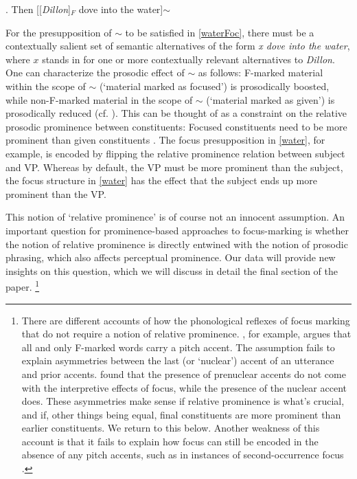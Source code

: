 \documentclass[preprint,review,12pt,authoryear,times]{elsarticle}
\begin{document}
\ex. Then [[{\em Dillon}]$_F$ dove into the water]$\sim$\label{waterFoc}

For the presupposition of $\sim$ to be satisfied in \ref{waterFoc}, there must be  a contextually salient set of semantic alternatives of the form  {\em x dove into the water}, where $x$ stands in for one or more contextually relevant alternatives to {\em Dillon}. One can characterize the prosodic effect of $\sim$ as follows: F-marked material within the scope of $\sim$ (`material marked as focused') is prosodically boosted, while non-F-marked material in the scope of $\sim$ (`material marked as given') is prosodically reduced  (cf. \citealt{rooth92b,truck95}). This can be thought of as a constraint on the relative prosodic prominence between constituents: Focused constituents need to be more prominent than given constituents \citep[cf.][]{willi97,  szend03, wagner05recursion, reinh06, burin16b}. The focus presupposition in \ref{water}, for example, is encoded by flipping the relative prominence relation between subject and VP. Whereas by default, the VP must be more prominent than the subject, the focus structure in \ref{water} has the effect that the subject ends up more prominent than the VP. 

This notion of `relative prominence' is of course not an innocent assumption. An important question for prominence-based approaches to focus-marking is whether the notion of relative prominence is directly entwined with the notion of prosodic phrasing, which also affects perceptual prominence. Our data will provide new insights on this question, which we will discuss in detail the final section of the paper. 
\footnote{There are different accounts of how the phonological reflexes of focus marking that do not require a notion of relative prominence.  \citet{schwa99}, for example, argues that all and only F-marked words carry a pitch accent. The assumption fails to explain asymmetries between the last (or `nuclear') accent of an utterance and prior accents. \citet{welby03} found that the presence of prenuclear accents do not come with the interpretive effects of focus, while the presence of the nuclear accent does. These asymmetries make sense if relative prominence is what's crucial, and if, other things being equal, final constituents are more prominent than earlier constituents. We return to this below. Another weakness of this account is that it fails to explain how focus can still be encoded in the absence of any pitch accents, such as in instances of second-occurrence focus \citep{burin16b,bauma16}.}
\end{document}
